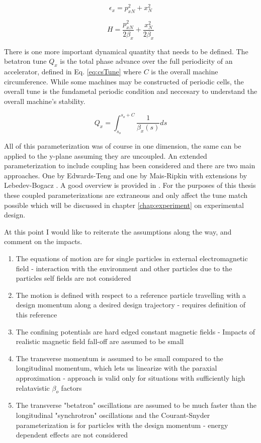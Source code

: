 \begin{equation} \label{eq:csNormEmit}
	\epsilon_x = p_{xN}^2 + x_{N}^2
\end{equation}

\begin{equation} \label{eq:csNormHam}
	H = \frac{p_{xN}^2}{2\beta_x} + \frac{x_{N}^2}{2\beta_x}
\end{equation}

There is one more important dynamical quantity that needs to be defined. The betatron tune $Q_x$ is the total phase advance over the full periodicity of an accelerator, defined in Eq. \ref{eq:csTune} where $C$ is the overall machine circumference. While some machines may be constructed of periodic cells, the overall tune is the fundametal periodic condition and neccesary to understand the overall machine's stability.

\begin{equation} \label{eq:csTune}
	Q_x = \int_{s_o}^{s_o + C} \frac{1}{\beta_x(s)} ds
\end{equation}

All of this parameterization was of course in one dimension, the same can be applied to the y-plane assuming they are uncoupled. An extended parameterization to include coupling has been considered and there are two main approaches. One by Edwards-Teng \cite{edwards-teng} and one by Mais-Ripkin \cite{mais-ripkin} with extensions by Lebedev-Bogacz \cite{lebedev-bogacz}. A good overview is provided in \cite{vanwelde}. For the purposes of this thesis these coupled parameterizations are extraneous and only affect the tune match possible which will be discussed in chapter \ref{chap:experiment} on experimental design.

At this point I would like to reiterate the assumptions along the way, and comment on the impacts.
\begin{enumerate}
	\item The equations of motion are for single particles in external electromagnetic field - interaction with the environment and other particles due to the particles self fields are not considered
	\item The motion is defined with respect to a reference particle travelling with a design momentum along a desired design trajectory - requires definition of this reference
	\item The confining potentials are hard edged constant magnetic fields - Impacts of realistic magnetic field fall-off are assumed to be small
	\item The transverse momentum is assumed to be small compared to the longitudinal momentum, which lets us linearize with the paraxial approximation - approach is valid only for situations with sufficiently high relatavistic $\beta_o$ factors
	\item The transverse "betatron" oscillations are assumed to be much faster than the longitudinal "synchrotron" oscillations and the Courant-Snyder parameterization is for particles with the design momentum - energy dependent effects are not considered
\end{enumerate}

